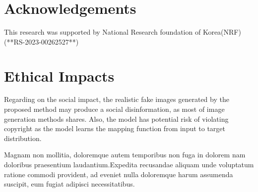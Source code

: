 \documentclass[letterpaper]{article} %
\begin{document}
\section{Acknowledgements}
This research was supported by National Research foundation of Korea(NRF) (**RS-2023-00262527**)

\section{Ethical Impacts}
Regarding on the social impact, the realistic fake images generated by the proposed method may produce a social disinformation, as most of image generation methods shares. Also, the model has potential risk of violating copyright as the model learns the mapping function from input to target distribution.


Magnam non mollitia, doloremque autem temporibus non fuga in dolorem nam doloribus praesentium laudantium.Expedita recusandae aliquam unde voluptatum ratione commodi provident, ad eveniet nulla doloremque harum assumenda suscipit, eum fugiat adipisci necessitatibus.\clearpage

\end{document}
